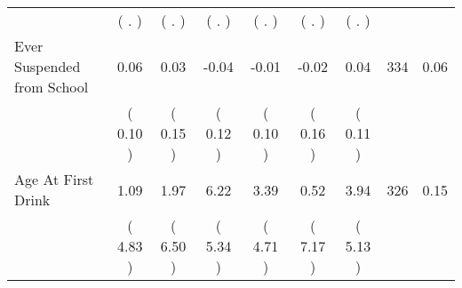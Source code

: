 \begin{tabular}{lcccccccc}
 & (        . ) & (        . ) & (        . ) & (        . ) & (        . ) & (        . ) & \\
Ever Suspended from School &      0.06 &      0.03 &     -0.04 &     -0.01 &     -0.02 &      0.04 & 334 &       0.06 \\ 
 & (     0.10 ) & (     0.15 ) & (     0.12 ) & (     0.10 ) & (     0.16 ) & (     0.11 ) & \\
Age At First Drink &      1.09 &      1.97 &      6.22 &      3.39 &      0.52 &      3.94 & 326 &       0.15 \\ 
 & (     4.83 ) & (     6.50 ) & (     5.34 ) & (     4.71 ) & (     7.17 ) & (     5.13 ) & \\
\bottomrule
\end{tabular}
